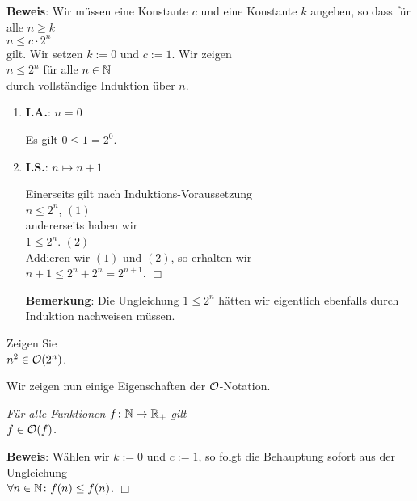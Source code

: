 \noindent
\textbf{Beweis}: Wir m\"ussen eine Konstante $c$ und eine Konstante $k$ angeben, so dass f\"ur
alle $n \geq k$
\\[0.1cm]
\hspace*{1.3cm} $ n \leq c \cdot 2^n$ \\[0.1cm]
gilt.  Wir setzen $k := 0$ und $c := 1$.  Wir zeigen \\[0.1cm]
\hspace*{1.3cm} $n \leq 2^n$ \quad f\"ur alle $n \in {\mathbb N}$ \\[0.1cm]
durch vollst\"andige Induktion \"uber $n$.
\begin{enumerate}
\item \textbf{I.A.}: $n = 0$

      Es gilt $0 \leq 1 = 2^0$.
\item \textbf{I.S.}: $n \mapsto n + 1$

      Einerseits gilt nach Induktions-Voraussetzung \\[0.1cm]
      \hspace*{1.3cm} $n \leq 2^n$, \hspace*{\fill} $(1)$ \\[0.1cm]
      andererseits haben wir \\[0.1cm]
      \hspace*{1.3cm} $1 \leq 2^n$. \hspace*{\fill} $(2)$ \\[0.1cm]
      Addieren wir $(1)$ und $(2)$, so erhalten wir \\[0.1cm]
      \hspace*{1.3cm} $n+1 \leq 2^n + 2^n = 2^{n+1}$. \hspace*{\fill} $\Box$

      \textbf{Bemerkung}: Die Ungleichung $1 \leq 2^n$ h\"atten wir eigentlich ebenfalls
      durch Induktion  nachweisen m\"ussen.
\end{enumerate}

\exercise
Zeigen Sie \\[0.1cm]
\hspace*{1.3cm} $n^2 \in \mathcal{O}(2^n)$.
\vspace*{0.3cm}

\noindent
Wir zeigen nun einige Eigenschaften der $\mathcal{O}$-Notation.

\begin{Satz}[Reflexivit\"at]
{\em
  F\"ur alle Funktionen $f\colon {\mathbb N} \rightarrow {{\mathbb R}_+}$ gilt \\[0.1cm]
  \hspace*{1.3cm} $f \in \mathcal{O}(f)$. 
}
\end{Satz}
\textbf{Beweis}: W\"ahlen wir $k:=0$ und $c:=1$, so folgt die Behauptung sofort aus der
Ungleichung \\[0.1cm]
\hspace*{1.3cm} $\forall n \in {\mathbb N}\colon f(n) \leq f(n)$. \hspace*{\fill} $\Box$

